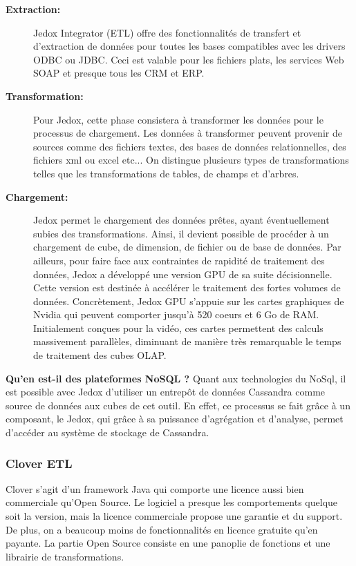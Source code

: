 \documentclass[12pt,a4wide,twoside]{report}
\begin{document}
\begin{description}
	\item[\textbf{Extraction:}]
	Jedox Integrator (ETL) offre des fonctionnalités de transfert et d’extraction de données pour toutes les bases compatibles avec les drivers ODBC ou JDBC. Ceci est valable pour les fichiers plats, les services Web SOAP et presque tous les CRM et ERP.\newline
	 

	\item[\textbf{Transformation:}]
	Pour Jedox, cette phase consistera à transformer les données pour le processus de chargement. Les données à transformer peuvent provenir de sources comme des fichiers textes, des bases de données relationnelles, des fichiers xml ou excel etc...\newline
	On distingue plusieurs types de transformations telles que les transformations de tables, de champs et d'arbres.

	\item[\textbf{Chargement:}]
	Jedox permet le chargement des données prêtes, ayant éventuellement subies des transformations. Ainsi, il devient possible de procéder à un chargement de cube, de dimension, de fichier ou de base de données.\newline
Par ailleurs, pour faire face aux contraintes de rapidité de traitement des données, Jedox a développé une version GPU de sa suite décisionnelle. Cette version est destinée à accélérer le traitement des fortes volumes de données. Concrètement, Jedox GPU s'appuie sur les cartes graphiques de Nvidia qui peuvent comporter jusqu'à 520 coeurs et 6 Go de RAM. Initialement conçues pour la vidéo, ces cartes permettent des calculs massivement parallèles, diminuant de manière très remarquable le temps de traitement des cubes OLAP. \cite{art3} 
	
\end{description}
\textbf{Qu'en est-il des plateformes NoSQL ?} \newline
Quant aux technologies du NoSql, il est possible avec Jedox d'utiliser un entrepôt de données Cassandra comme source de données aux cubes de cet outil. En effet, ce processus se fait grâce à un composant, le  Jedox, qui grâce à sa puissance d'agrégation et d'analyse, permet d'accéder au système de stockage de Cassandra.\cite{art2}



\subsubsection{Clover ETL}
Clover s’agit d’un framework Java qui comporte une licence aussi bien commerciale qu’Open Source. Le logiciel a presque les comportements quelque soit la version, mais la licence commerciale propose une garantie et du support. De plus, on a beaucoup moins de fonctionnalités en licence gratuite qu’en payante. La partie Open Source consiste en une panoplie de fonctions et une librairie de transformations.
\end{document}
